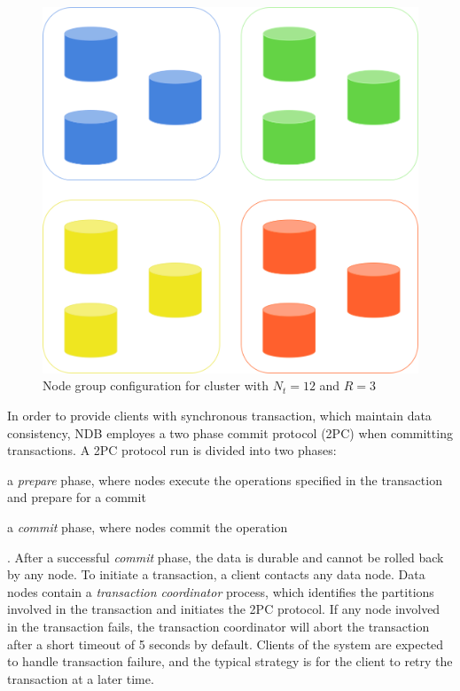 \begin{figure}[H]
\caption{Node group configuration for cluster with $N_t = 12$ and $R = 3$}
\label{fig:ndb-node-groups}
\centering
\includegraphics[width=1.0\textwidth]{images/ndb-node-groups.png}
\end{figure}

In order to provide clients with synchronous transaction, which maintain data consistency, NDB employes a two phase commit protocol (2PC) \cite{bernstein1987rrency} when committing transactions.
A 2PC protocol run is divided into two phases: \begin{inparaenum}
    \item a \emph{prepare} phase, where nodes execute the operations specified in the transaction and prepare for a commit
    \item a \emph{commit} phase, where nodes commit the operation
\end{inparaenum}.
After a successful \emph{commit} phase, the data is durable and cannot be rolled back by any node.
To initiate a transaction, a client contacts any data node.
Data nodes contain a \emph{transaction coordinator} process, which identifies the partitions involved in the transaction and initiates the 2PC protocol.
If any node involved in the transaction fails, the transaction coordinator will abort the transaction after a short timeout of 5 seconds by default.
Clients of the system are expected to handle transaction failure, and the typical strategy is for the client to retry the transaction at a later time.

